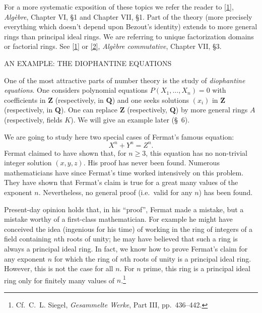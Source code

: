 For a more systematic exposition of these topics we refer the reader to
\hyperref[bib:1]{[1]}, \emph{Algèbre}, Chapter VI, §1 and Chapter VII, §1. Part of the theory
(more precisely everything which doesn't depend upon Bezout's identity)
extends to more general rings than principal ideal rings. We are referring
to unique factorization domains or factorial rings. See \hyperref[bib:1]{[1]} or \hyperref[bib:2]{[2]},
\emph{Algèbre commutative}, Chapter VII, §3.

%
        {AN EXAMPLE: THE DIOPHANTINE EQUATIONS}

One of the most attractive parts of number theory is the study of
\emph{diophantine equations}. One considers polynomial equations
$P(X_{1},\ldots,X_{n})=0$ with coefficients in $\mathbf{Z}$ (respectively,
in $\mathbf{Q}$) and one seeks solutions $(x_{i})$ in $\mathbf{Z}$
(respectively, in $\mathbf{Q}$). One can replace $\mathbf{Z}$
(respectively, $\mathbf{Q}$) by more general rings $A$ (respectively,
fields $K$). We will give an example later (§~6).

We are going to study here two special cases of Fermat's famous equation:
\begin{equation}
X^{n}+Y^{n}=Z^{n}.
\label{eq:I.2.1}
\end{equation}
Fermat claimed to have shown that, for $n\geq3$, this equation has no
non-trivial integer solution $(x,y,z)$. His proof has never been found.
Numerous mathematicians have since Fermat's time worked intensively on this
problem. They have shown that Fermat's claim is true for a great many values
of the exponent $n$. Nevertheless, no general proof (i.e.\ valid for any
$n$) has been found.

Present-day opinion holds that, in his ``proof'', Fermat made a mistake, but
a mistake worthy of a first-class mathematician. For example he might have
conceived the idea (ingenious for his time) of working in the ring of
integers of a field containing $n$th roots of unity; he may have believed
that such a ring is always a principal ideal ring. In fact, we know how to
prove Fermat's claim for any exponent $n$ for which the ring of $n$th roots
of unity is a principal ideal ring. However, this is not the case for all
$n$. For $n$ prime, this ring is a principal ideal ring only for finitely
many values of $n$.\footnote{Cf.\ C.~L. Siegel, \emph{Gesammelte Werke},
Part III, pp.~436--442.}

